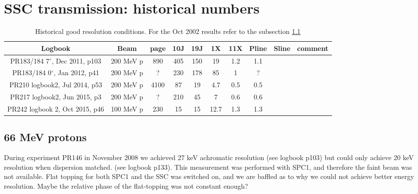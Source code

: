 \documentclass[11pt]{report}
\begin{document}
\section{SSC transmission: historical numbers}


\begin{landscape}

\begin{table}[!ht]
\centering
\begin{tabular}{|c|c|c|c|c|c|c|c|c|c|}
\hline
Logbook & Beam & page & 10J & 19J & 1X & 11X & Pline & Sline & comment\\ 
\hline
\hline
PR183/184 7$^{\circ}$, Dec 2011, p103 & 200 MeV p &   890 & 405 & 150 & 19 & 1.2 & 1.1 & \\
PR183/184 0$^{\circ}$, Jan 2012, p41 & 200 MeV p &   ? & 230 & 178 & 85 & 1 & ? & \\

PR210 logbook2, Jul 2014, p53 & 200 MeV p & 4100 & 87 & 19 & 4.7 & 0.5 & 0.5 & \\
PR217 logbook2, Jun 2015, p3 & 200 MeV p & ? & 210 & 45 & 7 & 0.6 & 0.6 & \\

PR242 logbook 2, Oct 2015, p46 & 100 MeV p &  230 & 15 & 15 & 12.7 & 1.3 & 1.3 & \\

\hline
\end{tabular}
\caption{Historical good resolution conditions. For the Oct 2002 results refer 
to the subsection \ref{sec:66MeVprotons}}
\label{table:goodresolution}
\end{table}

\end{landscape}









\subsection{66 MeV protons}\label{sec:66MeVprotons}

During experiment PR146 in November 2008 we achieved 27 keV achromatic resolution
(see logbook p103) but could only achieve 20 keV resolution when dispersion matched.
(see logbook p133).
This measurement was performed with SPC1, and therefore the faint beam was not available.
Flat topping for both SPC1 and the SSC was switched on, and we are baffled as to why we could
not achieve better energy resolution. Maybe the relative phase of the flat-topping was
not constant enough?
\end{document}
